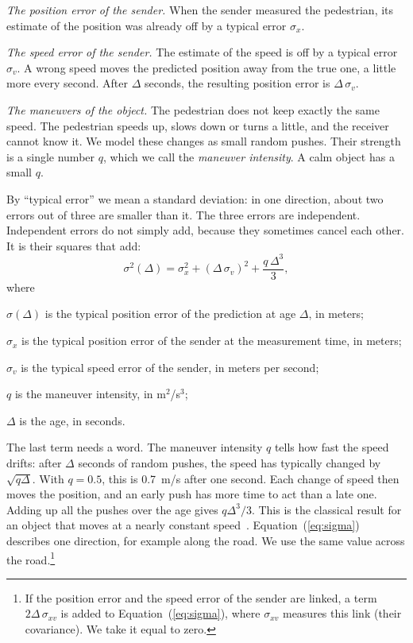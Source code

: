\documentclass[conference]{IEEEtran}
\newcommand{\Eq}[1]{Equation~(\ref{#1})}     %
\newenvironment{where}{\begin{list}{\textbullet}{\setlength{\topsep}{2pt}\setlength{\partopsep}{0pt}%
\setlength{\itemsep}{0pt}\setlength{\parsep}{0pt}\setlength{\leftmargin}{1.5em}%
\setlength{\labelwidth}{0.6em}\setlength{\labelsep}{0.5em}}}{\end{list}}
\begin{document}
\emph{The position error of the sender.} When the sender measured the
pedestrian, its estimate of the position was already off by a typical error
$\sigma_x$.

\emph{The speed error of the sender.} The estimate of the speed is off by a
typical error $\sigma_v$. A wrong speed moves the predicted position away from
the true one, a little more every second. After $\Delta$ seconds, the
resulting position error is $\Delta\,\sigma_v$.

\emph{The maneuvers of the object.} The pedestrian does not keep exactly the
same speed. The pedestrian speeds up, slows down or turns a little, and the
receiver cannot know it. We model these changes as small random pushes. Their
strength is a single number $q$, which we call the \emph{maneuver intensity}.
A calm object has a small $q$.

By ``typical error'' we mean a standard deviation: in one direction, about two
errors out of three are smaller than it. The three errors are independent.
Independent errors do not simply add, because they sometimes cancel each
other. It is their squares that add:
\begin{equation}\label{eq:sigma}
\sigma^2(\Delta)=\sigma_x^2+(\Delta\,\sigma_v)^2+\frac{q\,\Delta^3}{3},
\end{equation}
where
\begin{where}
\item $\sigma(\Delta)$ is the typical position error of the prediction at age
$\Delta$, in meters;
\item $\sigma_x$ is the typical position error of the sender at the
measurement time, in meters;
\item $\sigma_v$ is the typical speed error of the sender, in meters per
second;
\item $q$ is the maneuver intensity, in m$^2$/s$^3$;
\item $\Delta$ is the age, in seconds.
\end{where}
The last term needs a word. The maneuver intensity $q$ tells how fast the
speed drifts: after $\Delta$ seconds of random pushes, the speed has typically
changed by $\sqrt{q\Delta}$. With $q=0.5$, this is 0.7~m/s after one second.
Each change of speed then moves the position, and an early push has more time
to act than a late one. Adding up all the pushes over the age gives
$q\Delta^3/3$. This is the classical result for an object that moves at a
nearly constant speed~\cite{barshalom2001}. \Eq{eq:sigma} describes one
direction, for example along the road. We use the same value across the
road.\footnote{If the position
error and the speed error of the sender are linked, a term
$2\Delta\,\sigma_{xv}$ is added to \Eq{eq:sigma}, where $\sigma_{xv}$ measures
this link (their covariance). We take it equal to zero.}
\end{document}
